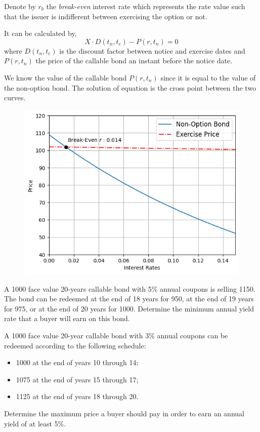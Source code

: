 \documentclass[12pt,a4paper]{article}
\begin{document}
Denote by $r_b$ the \emph{break-even} interest rate which represents the rate value such that the issuer is indifferent between exercising the option or not.

It can be calculated by,
\begin{equation}
X\cdot D(t_n, t_c) - P(r,t_n)=0
\end{equation}
where $D(t_n, t_c)$ is the discount factor between notice and exercise dates and $P(r,t_n)$ the price of the callable bond an instant before the notice date.

We know the value of the callable bond $P(r,t_n)$ since it is equal to the value of the non-option bond. The solution of equation is the cross point between the two curves.

\begin{figure}[htbp]
	\begin{center}
		\includegraphics[width=0.5\linewidth]{addons/callable_bond}
	\end{center}
	\label{fig:callable_bond}
\end{figure}

\begin{question} A 1000 face value 20-years callable bond with 5\% annual coupons is selling 1150. The bond can be redeemed at the end of 18 years for 950, at the end of 19 years for 975, or at the end of 20 years for 1000. Determine the minimum annual yield rate that a buyer will earn on this bond.
\end{question}

\begin{question} A 1000 face value 20-year callable bond with 3\% annual coupons can be redeemed according to the following schedule:
\begin{itemize}
	\item 1000 at the end of years 10 through 14;
	\item 1075 at the end of years 15 through 17;
	\item 1125 at the end of years 18 through 20.
\end{itemize}
Determine the maximum price a buyer should pay in order to earn an annual yield of at least 5\%.
\end{question}
\end{document}
